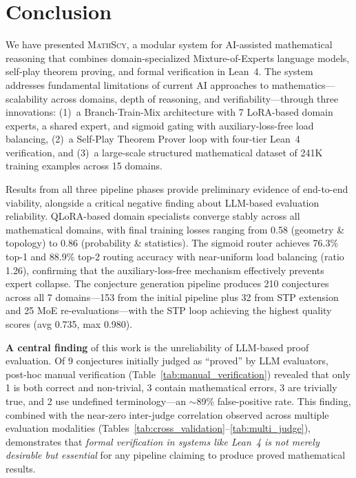 \documentclass[11pt,a4paper]{article}
\newcommand{\mathscy}{\textsc{MathScy}}
\begin{document}
\section{Conclusion}
\label{sec:conclusion}

We have presented \mathscy{}, a modular system for AI-assisted mathematical reasoning that combines domain-specialized Mixture-of-Experts language models, self-play theorem proving, and formal verification in Lean~4. The system addresses fundamental limitations of current AI approaches to mathematics---scalability across domains, depth of reasoning, and verifiability---through three innovations: (1)~a Branch-Train-Mix architecture with 7 LoRA-based domain experts, a shared expert, and sigmoid gating with auxiliary-loss-free load balancing, (2)~a Self-Play Theorem Prover loop with four-tier Lean~4 verification, and (3)~a large-scale structured mathematical dataset of 241K training examples across 15 domains.

Results from all three pipeline phases provide preliminary evidence of end-to-end viability, alongside a critical negative finding about LLM-based evaluation reliability. QLoRA-based domain specialists converge stably across all mathematical domains, with final training losses ranging from 0.58 (geometry \& topology) to 0.86 (probability \& statistics). The sigmoid router achieves 76.3\% top-1 and 88.9\% top-2 routing accuracy with near-uniform load balancing (ratio 1.26), confirming that the auxiliary-loss-free mechanism effectively prevents expert collapse. The conjecture generation pipeline produces 210 conjectures across all 7 domains---153 from the initial pipeline plus 32 from STP extension and 25 MoE re-evaluations---with the STP loop achieving the highest quality scores (avg 0.735, max 0.980).

\textbf{A central finding} of this work is the unreliability of LLM-based proof evaluation. Of 9 conjectures initially judged as ``proved'' by LLM evaluators, post-hoc manual verification (Table~\ref{tab:manual_verification}) revealed that only 1 is both correct and non-trivial, 3 contain mathematical errors, 3 are trivially true, and 2 use undefined terminology---an $\sim$89\% false-positive rate. This finding, combined with the near-zero inter-judge correlation observed across multiple evaluation modalities (Tables~\ref{tab:cross_validation}--\ref{tab:multi_judge}), demonstrates that \emph{formal verification in systems like Lean~4 is not merely desirable but essential} for any pipeline claiming to produce proved mathematical results.
\end{document}
